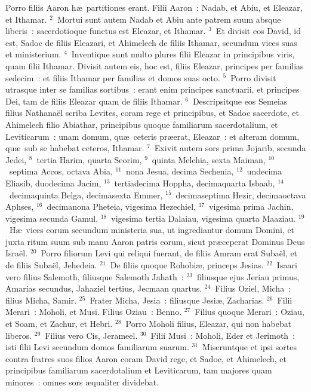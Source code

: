 \bchapter
\lettrine[lines=3,image=true,loversize=0.05,lraise=-0.03]{P}{}orro filiis Aaron h\ae\ partitiones erant. Filii Aaron~: Nadab, et Abiu, et Eleazar, et Ithamar.
${}^{2}$~Mortui sunt autem Nadab et Abiu ante patrem suum absque liberis~: sacerdotioque functus est Eleazar, et Ithamar.
${}^{3}$~Et divisit eos David, id est, Sadoc de filiis Eleazari, et Ahimelech de filiis Ithamar, secundum vices suas et ministerium.
${}^{4}$~Inventique sunt multo plures filii Eleazar in principibus viris, quam filii Ithamar. Divisit autem eis, hoc est, filiis Eleazar, principes per familias sedecim~: et filiis Ithamar per familias et domos suas octo.
${}^{5}$~Porro divisit utrasque inter se familias sortibus~: erant enim principes sanctuarii, et principes Dei, tam de filiis Eleazar quam de filiis Ithamar.
${}^{6}$~Descripsitque eos Semeias filius Nathana\"el scriba Levites, coram rege et principibus, et Sadoc sacerdote, et Ahimelech filio Abiathar, principibus quoque familiarum sacerdotalium, et Leviticarum~: unam domum, qu\ae\ ceteris pr\ae erat, Eleazar~: et alteram domum, qu\ae\ sub se habebat ceteros, Ithamar.
${}^{7}$~Exivit autem sors prima Jojarib, secunda Jedei,
${}^{8}$~tertia Harim, quarta Seorim,
${}^{9}$~quinta Melchia, sexta Maiman,
${}^{10}$~septima Accos, octava Abia,
${}^{11}$~nona Jesua, decima Sechenia,
${}^{12}$~undecima Eliasib, duodecima Jacim,
${}^{13}$~tertiadecima Hoppha, decimaquarta Isbaab,
${}^{14}$~decimaquinta Belga, decimasexta Emmer,
${}^{15}$~decimaseptima Hezir, decimaoctava Aphses,
${}^{16}$~decimanona Pheteia, vigesima Hezechiel,
${}^{17}$~vigesima prima Jachin, vigesima secunda Gamul,
${}^{18}$~vigesima tertia Dalaiau, vigesima quarta Maaziau.
${}^{19}$~H\ae\ vices eorum secundum ministeria sua, ut ingrediantur domum Domini, et juxta ritum suum sub manu Aaron patris eorum, sicut pr\ae ceperat Dominus Deus Isra\"el.
${}^{20}$~Porro filiorum Levi qui reliqui fuerant, de filiis Amram erat Suba\"el, et de filiis Suba\"el, Jehedeia.
${}^{21}$~De filiis quoque Rohobi\ae , princeps Jesias.
${}^{22}$~Isaari vero filius Salemoth, filiusque Salemoth Jahath~:
${}^{23}$~filiusque ejus Jeriau primus, Amarias secundus, Jahaziel tertius, Jecmaan quartus.
${}^{24}$~Filius Oziel, Micha~: filius Micha, Samir.
${}^{25}$~Frater Micha, Jesia~: filiusque Jesi\ae , Zacharias.
${}^{26}$~Filii Merari~: Moholi, et Musi. Filius Oziau~: Benno.
${}^{27}$~Filius quoque Merari~: Oziau, et Soam, et Zachur, et Hebri.
${}^{28}$~Porro Moholi filius, Eleazar, qui non habebat liberos.
${}^{29}$~Filius vero Cis, Jerameel.
${}^{30}$~Filii Musi~: Moholi, Eder et Jerimoth~: isti filii Levi secundum domos familiarum suarum.
${}^{31}$~Miseruntque et ipsi sortes contra fratres suos filios Aaron coram David rege, et Sadoc, et Ahimelech, et principibus familiarum sacerdotalium et Leviticarum, tam majores quam minores~: omnes sors \ae qualiter dividebat.

